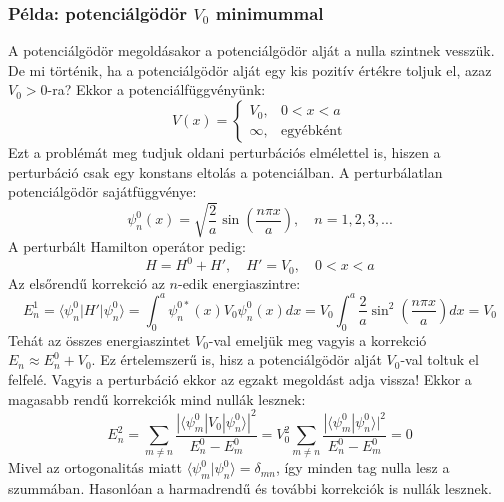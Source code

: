 \documentclass[../main.tex]{subfiles}
\begin{document}
\subsubsection*{Példa: potenciálgödör $V_0$ minimummal}
A potenciálgödör megoldásakor a potenciálgödör alját a nulla szintnek vesszük. De mi történik, ha a potenciálgödör alját egy kis pozitív értékre toljuk el, azaz $V_0 > 0$-ra? Ekkor a potenciálfüggvényünk:
\begin{equation}
    V(x) = \begin{cases}
        V_0, & 0 < x < a \\
        \infty, & \text{egyébként}
    \end{cases}
\end{equation}
Ezt a problémát meg tudjuk oldani perturbációs elmélettel is, hiszen a perturbáció csak egy konstans eltolás a potenciálban.
A perturbálatlan potenciálgödör sajátfüggvénye:
\begin{equation}
    \psi_n^0 (x) = \sqrt{\frac{2}{a}} \sin \left( \frac{n \pi x}{a} \right), \quad n = 1,2,3,...
\end{equation}
A perturbált Hamilton operátor pedig:
\begin{equation}
    H = H^0 + H', \quad H' = V_0, \quad 0 < x < a
\end{equation}
Az elsőrendű korrekció az $n$-edik energiaszintre:
\begin{equation}
    E_n^1 = \langle \psi_n^0 | H' | \psi_n^0 \rangle = \int_0^a \psi_n^{0*} (x) V_0 \psi_n^0 (x) dx = V_0 \int_0^a \frac{2}{a} \sin^2 \left(\frac{n \pi x}{a} \right) dx = V_0
\end{equation}
Tehát az összes energiaszintet $V_0$-val emeljük meg vagyis a korrekció $E_n \approx E_n^0 + V_0$. Ez értelemszerű is, hisz a potenciálgödör alját $V_0$-val toltuk el felfelé.
Vagyis a perturbáció ekkor az egzakt megoldást adja vissza! Ekkor a magasabb rendű korrekciók mind nullák lesznek:
\begin{equation}
    E_n^2 = \sum_{m \neq n} \frac{|\langle \psi_m^0 | V_0 | \psi_n^0 \rangle|^2}{E_n^0 - E_m^0} = V_0^2 \sum_{m \neq n} \frac{|\langle \psi_m^0 | \psi_n^0 \rangle|^2}{E_n^0 - E_m^0} = 0
\end{equation}
Mivel az ortogonalitás miatt $\langle \psi_m^0 | \psi_n^0 \rangle = \delta_{mn}$, így minden tag nulla lesz a szummában. Hasonlóan a harmadrendű és további korrekciók is nullák lesznek.
\end{document}
